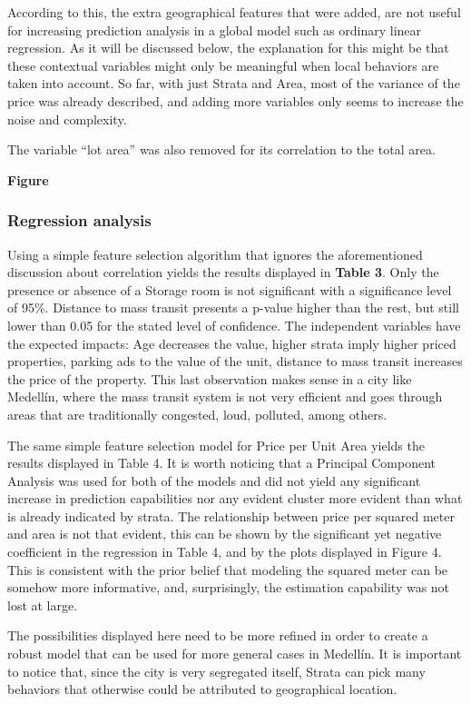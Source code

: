 \documentclass[journal]{IEEEtran}
\begin{document}
According to this, the extra geographical features that were added, are not useful for increasing prediction analysis in a global model such as ordinary linear regression. As it will be discussed below, the
explanation for this might be that these contextual variables might only be meaningful when local behaviors are taken into account. So far, with just Strata and Area, most of the variance of the price was
already described, and adding more variables only seems to increase the noise and complexity.

The variable “lot area” was also removed for its correlation to the total area.

\textbf{Figure}

\subsubsection*{Regression analysis}

Using a simple feature selection algorithm that ignores the aforementioned discussion about correlation yields the results displayed in \textbf{Table 3}. Only the presence or absence of a Storage room is not significant with a significance level of 95\%. Distance to mass transit presents a p-value higher than the rest,
but still lower than 0.05 for the stated level of confidence. The independent variables have the expected impacts: Age decreases the value, higher strata imply higher priced properties, parking ads to
the value of the unit, distance to mass transit increases the price of the property. This last observation makes sense in a city like Medellín, where the mass transit system is not very efficient and goes through areas that are traditionally congested, loud, polluted, among
others.

The same simple feature selection model for Price per Unit Area yields the results displayed in Table 4. It is worth noticing that a Principal Component Analysis was used for both of the models and did not yield any significant increase in prediction capabilities nor any
evident cluster more evident than what is already indicated by strata.
The relationship between price per squared meter and area is not that evident, this can be shown by the significant yet negative coefficient in the regression in Table 4, and by the plots displayed in Figure 4. This is consistent with the prior belief that modeling the squared meter can be somehow more informative, and, surprisingly, the estimation capability was not lost at large.

The possibilities displayed here need to be more refined in order to create a robust model that can be used for more general cases in Medellín. It is important to notice that, since the city is very segregated itself, Strata can pick many behaviors that otherwise could be attributed to geographical location.
\end{document}
